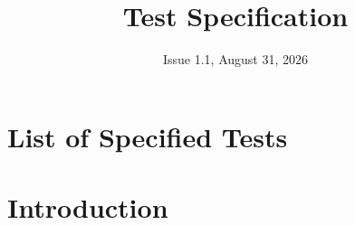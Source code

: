 

\title{Test Specification}
\def \documentid {FLIGHTOS-UVIE-TS-001}
\date{Issue 1.1, August 31, 2026}

\newcommand\affil[1]{\textsuperscript#1}

\def\preparedby {Armin Luntzer\affil{1}}
\def\checkedby {Roland Ottensamer\affil{1}}
\def\approvedby {Franz Kerschbaum\affil{1}}
\def\authorisedby{-}

\def\affiliations{
	\affil{1} Department of Astrophysics, University of Vienna
}







\usepackage{enumitem}
\usepackage{vhistory}

\usepackage[
	backend=biber,
	defernumbers,
	natbib=true,
	style=numeric, %
	sorting=none,
]{biblatex}



%




\rereadauxdesignlabels

\rereadauxdesignlabels






\tableofcontents
\newpage


\chapter*{List of Specified Tests}
\label{listoftests}
\the\designlist


\begin{versionhistory}
\end{versionhistory}


\chapter{Introduction}


